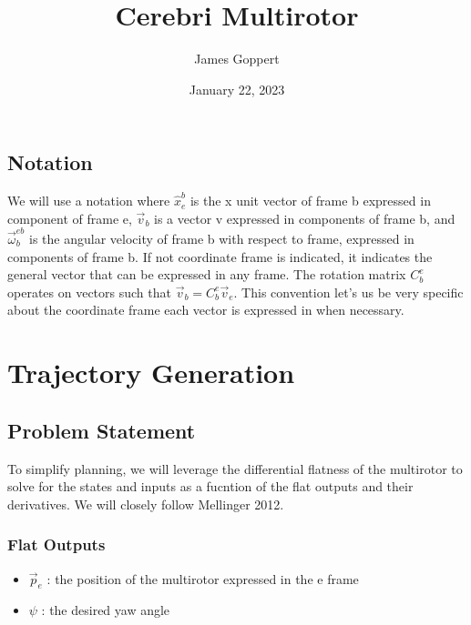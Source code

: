 \documentclass[10pt]{article}
\title{Cerebri Multirotor}
\date{January 22, 2023}
\author{James Goppert}
\begin{document}
\maketitle
\tableofcontents

\subsection*{Notation}

We will use a notation where $\hat{x}^b_e$ is the x unit vector of
frame b expressed in component of frame e, $\vec{v}_b$ is a vector v
expressed in components of frame b, and $\vec{\omega}^{eb}_b$ is the
angular velocity of frame b with respect to frame, expressed in
components of frame b. If not coordinate frame is indicated,
it indicates the general vector that can be expressed in any frame.
The rotation matrix $C^e_b$ operates on vectors such that
$\vec{v}_b = C^e_b \vec{v}_e$. This convention let's us be very
specific about the coordinate frame each vector is expressed in when necessary.

\section{Trajectory Generation}


\subsection{Problem Statement}

To simplify planning, we will leverage the differential flatness of the multirotor
to solve for the states and inputs as a fucntion of the flat outputs and
their derivatives. We will closely follow Mellinger 2012\cite{mellinger2012}.


\subsubsection*{Flat Outputs}
\begin{itemize}
    \item $\vec{p}_e$ : the position of the multirotor expressed in the e frame
    \item $\psi$ : the desired yaw angle

\end{itemize}
\end{document}
